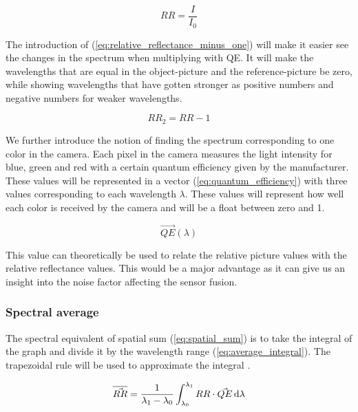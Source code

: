 \begin{equation}
    \label{eq:relative_reflectance}
    RR = \frac{I}{I_0}
\end{equation}

The introduction of (\ref{eq:relative_reflectance_minus_one}) will make it easier see the changes in the spectrum when multiplying with QE. It will make the wavelengths that are equal in the object-picture and the reference-picture be zero, while showing wavelengths that have gotten stronger as positive numbers and negative numbers for weaker wavelengths.  

\begin{equation}
    \label{eq:relative_reflectance_minus_one}
    RR_2 = RR - 1
\end{equation}

We further introduce the notion of finding the spectrum corresponding to one color in the camera. Each pixel in the camera measures the light intensity for blue, green and red with a certain quantum efficiency given by the manufacturer. These values will be represented in a vector (\ref{eq:quantum_efficiency}) with three values corresponding to each wavelength $\lambda$. These values will represent how well each color is received by the camera and will be a float between zero and 1. 

\begin{equation}
    \label{eq:quantum_efficiency}
    \vec{QE}(\lambda)    
\end{equation}

This value can theoretically be used to relate the relative picture values with the relative reflectance values. This would be a major advantage as it can give us an insight into the noise factor affecting the sensor fusion.  

\subsubsection{Spectral average}
\label{sec:spectral_average}

The spectral equivalent of spatial sum (\ref{eq:spatial_sum}) is to take the integral of the graph and divide it by the wavelength range (\ref{eq:average_integral}). The trapezoidal rule will be used to approximate the integral \cite{TrapezoidRuleMathematical}. 

\begin{equation}
    \label{eq:average_integral}
    \overline{\vec{RR}} = \frac{1}{\lambda_1 - \lambda_0} \int_{\lambda_0}^{\lambda_1} RR \cdot \vec{QE} \,\mathrm{d}\lambda 
\end{equation}

